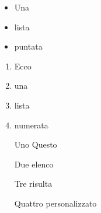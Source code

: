 \begin{itemize}
\item Una
\item lista
\item puntata
\end{itemize}


\begin{enumerate}
\item Ecco
\item una
\item lista
\item numerata
\end{enumerate}


\begin{itemize}
 \item[Uno] Questo
 \item[Due] elenco
 \item[Tre] risulta
 \item[Quattro] personalizzato
\end{itemize}
